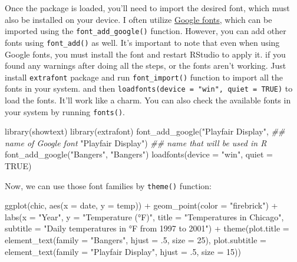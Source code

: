 \documentclass[
  letterpaper,
  DIV=11,
  numbers=noendperiod]{scrreprt}
\newenvironment{Shaded}{\begin{snugshade}}{\end{snugshade}}
\newcommand{\AttributeTok}[1]{\textcolor[rgb]{0.40,0.45,0.13}{#1}}
\newcommand{\ConstantTok}[1]{\textcolor[rgb]{0.56,0.35,0.01}{#1}}
\newcommand{\DecValTok}[1]{\textcolor[rgb]{0.68,0.00,0.00}{#1}}
\newcommand{\DocumentationTok}[1]{\textcolor[rgb]{0.37,0.37,0.37}{\textit{#1}}}
\newcommand{\FunctionTok}[1]{\textcolor[rgb]{0.28,0.35,0.67}{#1}}
\newcommand{\NormalTok}[1]{\textcolor[rgb]{0.00,0.23,0.31}{#1}}
\newcommand{\SpecialCharTok}[1]{\textcolor[rgb]{0.37,0.37,0.37}{#1}}
\newcommand{\StringTok}[1]{\textcolor[rgb]{0.13,0.47,0.30}{#1}}
\begin{document}
Once the package is loaded, you'll need to import the desired font,
which must also be installed on your device. I often utilize
\href{https://fonts.google.com/}{Google fonts}, which can be imported
using the \texttt{font\_add\_google()} function. However, you can add
other fonts using \texttt{font\_add()} as well. It's important to note
that even when using Google fonts, you must install the font and restart
RStudio to apply it. if you found any warnings after doing all the
steps, or the fonts aren't working. Just install \texttt{extrafont}
package and run \texttt{font\_import()} function to import all the fonts
in your system. and then
\texttt{loadfonts(device\ =\ "win",\ quiet\ =\ TRUE)} to load the fonts.
It'll work like a charm. You can also check the available fonts in your
system by running \texttt{fonts()}.

\begin{Shaded}
\begin{Highlighting}[]
\FunctionTok{library}\NormalTok{(showtext)}
\FunctionTok{library}\NormalTok{(extrafont)}
\FunctionTok{font\_add\_google}\NormalTok{(}\StringTok{"Playfair Display"}\NormalTok{, }\DocumentationTok{\#\# name of Google font}
                \StringTok{"Playfair Display"}\NormalTok{)  }\DocumentationTok{\#\# name that will be used in R}
\FunctionTok{font\_add\_google}\NormalTok{(}\StringTok{"Bangers"}\NormalTok{, }\StringTok{"Bangers"}\NormalTok{)}
\FunctionTok{loadfonts}\NormalTok{(}\AttributeTok{device =} \StringTok{"win"}\NormalTok{, }\AttributeTok{quiet =} \ConstantTok{TRUE}\NormalTok{)}
\end{Highlighting}
\end{Shaded}

Now, we can use those font families by \texttt{theme()} function:

\begin{Shaded}
\begin{Highlighting}[]
\FunctionTok{ggplot}\NormalTok{(chic, }\FunctionTok{aes}\NormalTok{(}\AttributeTok{x =}\NormalTok{ date, }\AttributeTok{y =}\NormalTok{ temp)) }\SpecialCharTok{+}
  \FunctionTok{geom\_point}\NormalTok{(}\AttributeTok{color =} \StringTok{"firebrick"}\NormalTok{) }\SpecialCharTok{+}
  \FunctionTok{labs}\NormalTok{(}\AttributeTok{x =} \StringTok{"Year"}\NormalTok{, }\AttributeTok{y =} \StringTok{"Temperature (°F)"}\NormalTok{,}
       \AttributeTok{title =} \StringTok{"Temperatures in Chicago"}\NormalTok{,}
       \AttributeTok{subtitle =} \StringTok{"Daily temperatures in °F from 1997 to 2001"}\NormalTok{) }\SpecialCharTok{+}
  \FunctionTok{theme}\NormalTok{(}\AttributeTok{plot.title =} \FunctionTok{element\_text}\NormalTok{(}\AttributeTok{family =} \StringTok{"Bangers"}\NormalTok{, }\AttributeTok{hjust =}\NormalTok{ .}\DecValTok{5}\NormalTok{, }\AttributeTok{size =} \DecValTok{25}\NormalTok{),}
        \AttributeTok{plot.subtitle =} \FunctionTok{element\_text}\NormalTok{(}\AttributeTok{family =} \StringTok{"Playfair Display"}\NormalTok{, }\AttributeTok{hjust =}\NormalTok{ .}\DecValTok{5}\NormalTok{, }\AttributeTok{size =} \DecValTok{15}\NormalTok{))}
\end{Highlighting}
\end{Shaded}
\end{document}
